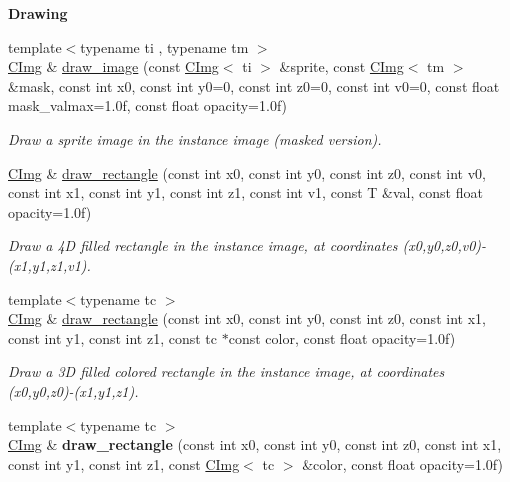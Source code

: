 \begin{Indent}{\bf Drawing}
\begin{DoxyCompactItemize}
\item 
{\footnotesize template$<$typename ti , typename tm $>$ }\\\hyperlink{structcimg__library_1_1_c_img}{C\-Img} \& \hyperlink{structcimg__library_1_1_c_img_a1bcea27e8a451f4b287fc7d7a4272f39}{draw\-\_\-image} (const \hyperlink{structcimg__library_1_1_c_img}{C\-Img}$<$ ti $>$ \&sprite, const \hyperlink{structcimg__library_1_1_c_img}{C\-Img}$<$ tm $>$ \&mask, const int x0, const int y0=0, const int z0=0, const int v0=0, const float mask\-\_\-valmax=1.\-0f, const float opacity=1.\-0f)
\begin{DoxyCompactList}\small\item\em Draw a sprite image in the instance image (masked version). \end{DoxyCompactList}\item 
\hyperlink{structcimg__library_1_1_c_img}{C\-Img} \& \hyperlink{structcimg__library_1_1_c_img_ad05cf69b3e05554a549aef4d76996739}{draw\-\_\-rectangle} (const int x0, const int y0, const int z0, const int v0, const int x1, const int y1, const int z1, const int v1, const T \&val, const float opacity=1.\-0f)
\begin{DoxyCompactList}\small\item\em Draw a 4\-D filled rectangle in the instance image, at coordinates ({\ttfamily x0},{\ttfamily y0},{\ttfamily z0},{\ttfamily v0})-\/({\ttfamily x1},{\ttfamily y1},{\ttfamily z1},{\ttfamily v1}). \end{DoxyCompactList}\item 
{\footnotesize template$<$typename tc $>$ }\\\hyperlink{structcimg__library_1_1_c_img}{C\-Img} \& \hyperlink{structcimg__library_1_1_c_img_a20f6a3ae25994d475c397127c0c2e516}{draw\-\_\-rectangle} (const int x0, const int y0, const int z0, const int x1, const int y1, const int z1, const tc $\ast$const color, const float opacity=1.\-0f)
\begin{DoxyCompactList}\small\item\em Draw a 3\-D filled colored rectangle in the instance image, at coordinates ({\ttfamily x0},{\ttfamily y0},{\ttfamily z0})-\/({\ttfamily x1},{\ttfamily y1},{\ttfamily z1}). \end{DoxyCompactList}\item 
\hypertarget{structcimg__library_1_1_c_img_aeefd501b747c2905b76bce06d7aa57bd}{{\footnotesize template$<$typename tc $>$ }\\\hyperlink{structcimg__library_1_1_c_img}{C\-Img} \& {\bfseries draw\-\_\-rectangle} (const int x0, const int y0, const int z0, const int x1, const int y1, const int z1, const \hyperlink{structcimg__library_1_1_c_img}{C\-Img}$<$ tc $>$ \&color, const float opacity=1.\-0f)}\label{structcimg__library_1_1_c_img_aeefd501b747c2905b76bce06d7aa57bd}


\end{DoxyCompactItemize}
\end{Indent}
